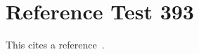 \documentclass{article}
\begin{document}
\section{Reference Test 393}
This cites a reference~\cite{test393}.

\end{document}

